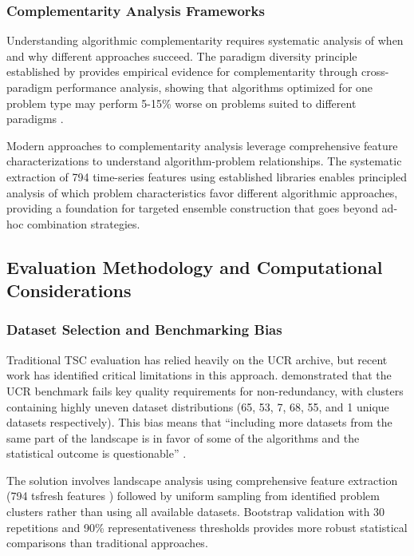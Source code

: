\documentclass[pdflatex,sn-basic]{sn-jnl}           %
\theoremstyle{thmstyleone}%
\theoremstyle{thmstyletwo}%
\theoremstyle{thmstylethree}%
\begin{document}
\subsubsection{Complementarity Analysis Frameworks}

Understanding algorithmic complementarity requires systematic analysis of when and why different approaches succeed. The paradigm diversity principle established by \citet[p.~637]{tsc-bakeoff} provides empirical evidence for complementarity through cross-paradigm performance analysis, showing that algorithms optimized for one problem type may perform 5-15\% worse on problems suited to different paradigms \citep[Table~11, p.~647]{tsc-bakeoff}.

Modern approaches to complementarity analysis leverage comprehensive feature characterizations to understand algorithm-problem relationships. The systematic extraction of 794 time-series features using established libraries enables principled analysis of which problem characteristics favor different algorithmic approaches, providing a foundation for targeted ensemble construction that goes beyond ad-hoc combination strategies.

\subsection{Evaluation Methodology and Computational Considerations}

\subsubsection{Dataset Selection and Benchmarking Bias}

Traditional TSC evaluation has relied heavily on the UCR archive, but recent work has identified critical limitations in this approach. \citet[p.~5]{less-is-more} demonstrated that the UCR benchmark fails key quality requirements for non-redundancy, with clusters containing highly uneven dataset distributions (65, 53, 7, 68, 55, and 1 unique datasets respectively). This bias means that ``including more datasets from the same part of the landscape is in favor of some of the algorithms and the statistical outcome is questionable'' \citep[p.~6]{less-is-more}.

The solution involves landscape analysis using comprehensive feature extraction (794 tsfresh features \citep[p.~3]{less-is-more}) followed by uniform sampling from identified problem clusters rather than using all available datasets. Bootstrap validation with 30 repetitions and 90\% representativeness thresholds \citep[p.~5-6]{less-is-more} provides more robust statistical comparisons than traditional approaches.
\end{document}
